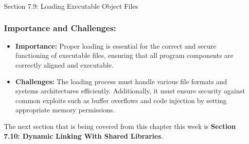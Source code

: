 \begin{notes}{Section 7.9: Loading Executable Object Files}
    \subsubsection*{Importance and Challenges:}
    
    \begin{itemize}
        \item \textbf{Importance:} Proper loading is essential for the correct and secure functioning of executable files, ensuring that all program components are correctly aligned and executable.
        \item \textbf{Challenges:} The loading process must handle various file formats and systems architectures efficiently. Additionally, it must ensure security against common exploits such as 
        buffer overflows and code injection by setting appropriate memory permissions.
    \end{itemize}    
\end{notes}

The next section that is being covered from this chapter this week is \textbf{Section 7.10: Dynamic Linking With Shared Libraries}.

